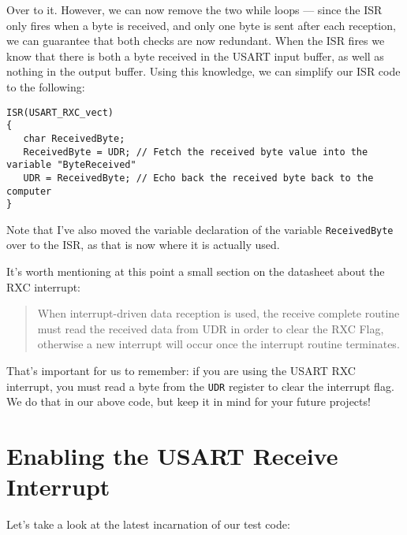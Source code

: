 \documentclass[a4paper,oneside,notitlepage]{book}
\begin{document}
Over to it. However, we can now remove the two while loops --- since the ISR only fires when a byte is received, and only one byte is sent after each reception, we can guarantee that both checks are now redundant. When the ISR fires we know that there is both a byte received in the USART input buffer, as well as nothing in the output buffer. Using this knowledge, we can simplify our ISR code to the following:

\begin{center}
\begin{lstlisting}
ISR(USART_RXC_vect)
{
   char ReceivedByte;
   ReceivedByte = UDR; // Fetch the received byte value into the variable "ByteReceived"
   UDR = ReceivedByte; // Echo back the received byte back to the computer
}
\end{lstlisting}
\end{center}

Note that I've also moved the variable declaration of the variable \texttt{ReceivedByte} over to the ISR, as that is now where it is actually used.

It's worth mentioning at this point a small section on the datasheet about the RXC interrupt:

\begin{quote}
When interrupt-driven data reception is used, the receive complete routine must read the received data from UDR in order to clear the RXC Flag, otherwise a new interrupt will occur once the interrupt routine terminates.
\end{quote}

That's important for us to remember: if you are using the USART RXC interrupt, you must read a byte from the \texttt{UDR} register to clear the interrupt flag. We do that in our above code, but keep it in mind for your future projects!


\chapter{Enabling the USART Receive Interrupt}

Let's take a look at the latest incarnation of our test code:
\end{document}
